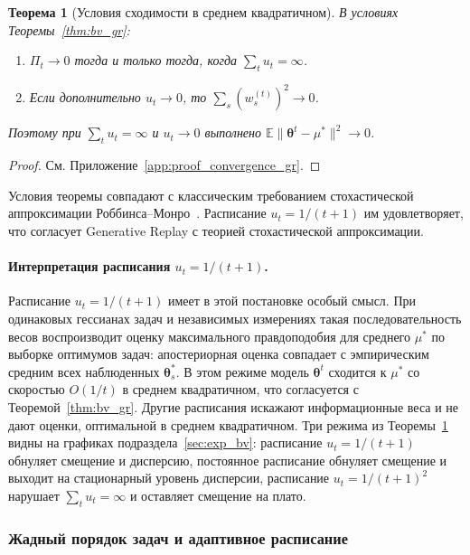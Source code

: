 \documentclass[a4paper,14pt,oneside,openany]{extarticle}
\newtheorem{theorem}{Теорема}
\newcommand{\bbE}{\mathbb{E}}
\newcommand{\btheta}{\boldsymbol{\theta}}
\begin{document}
\begin{theorem}[Условия сходимости в среднем квадратичном]\label{thm:convergence_gr}
    В условиях Теоремы~\ref{thm:bv_gr}:
    \begin{enumerate}
        \item $\Pi_t \to 0$ тогда и только тогда, когда $\sum_t u_t = \infty$.
        \item Если дополнительно $u_t \to 0$, то $\sum_s (w_s^{(t)})^2 \to 0$.
    \end{enumerate}
    Поэтому при $\sum_t u_t = \infty$ и $u_t \to 0$ выполнено $\bbE\|\btheta^t - \mu^*\|^2 \to 0$.
\end{theorem}

\begin{proof}См. Приложение~\ref{app:proof_convergence_gr}.\end{proof}

Условия теоремы совпадают с классическим требованием стохастической аппроксимации Роббинса--Монро~\cite{robbins1951stochastic}. Расписание $u_t = 1/(t+1)$ им удовлетворяет, что согласует Generative Replay с теорией стохастической аппроксимации.

\paragraph{Интерпретация расписания $u_t = 1/(t+1)$.}
Расписание $u_t = 1/(t+1)$ имеет в этой постановке особый смысл. При одинаковых гессианах задач и независимых измерениях такая последовательность весов воспроизводит оценку максимального правдоподобия для среднего $\mu^*$ по выборке оптимумов задач: апостериорная оценка совпадает с эмпирическим средним всех наблюденных $\btheta^*_s$. В этом режиме модель $\btheta^t$ сходится к $\mu^*$ со скоростью $O(1/t)$ в среднем квадратичном, что согласуется с Теоремой~\ref{thm:bv_gr}. Другие расписания искажают информационные веса и не дают оценки, оптимальной в среднем квадратичном. Три режима из Теоремы~\ref{thm:convergence_gr} видны на графиках подраздела~\ref{sec:exp_bv}: расписание $u_t = 1/(t+1)$ обнуляет смещение и дисперсию, постоянное расписание обнуляет смещение и выходит на стационарный уровень дисперсии, расписание $u_t = 1/(t+1)^2$ нарушает $\sum_t u_t = \infty$ и оставляет смещение на плато.

\subsubsection{Жадный порядок задач и адаптивное расписание}
\end{document}
